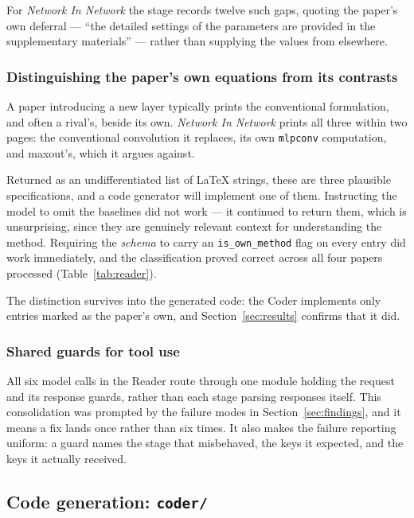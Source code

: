 \documentclass[11pt]{article}
\begin{document}
For \emph{Network In Network} the stage records twelve such gaps, quoting the paper's own
deferral --- ``the detailed settings of the parameters are provided in the supplementary
materials'' --- rather than supplying the values from elsewhere.

\subsubsection{Distinguishing the paper's own equations from its contrasts}

A paper introducing a new layer typically prints the conventional formulation, and often a
rival's, beside its own. \emph{Network In Network} prints all three within two pages: the
conventional convolution it replaces, its own \texttt{mlpconv} computation, and maxout's,
which it argues against.

Returned as an undifferentiated list of LaTeX strings, these are three plausible
specifications, and a code generator will implement one of them. Instructing the model to
omit the baselines did not work --- it continued to return them, which is unsurprising,
since they are genuinely relevant context for understanding the method. Requiring the
\emph{schema} to carry an \texttt{is\_own\_method} flag on every entry did work
immediately, and the classification proved correct across all four papers processed
(Table~\ref{tab:reader}).

The distinction survives into the generated code: the Coder implements only entries marked
as the paper's own, and Section~\ref{sec:results} confirms that it did.

\subsubsection{Shared guards for tool use}

All six model calls in the Reader route through one module holding the request and its
response guards, rather than each stage parsing responses itself. This consolidation was
prompted by the failure modes in Section~\ref{sec:findings}, and it means a fix lands once
rather than six times. It also makes the failure reporting uniform: a guard names the
stage that misbehaved, the keys it expected, and the keys it actually received.

\subsection{Code generation: \texttt{coder/}}
\end{document}
